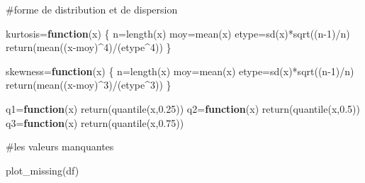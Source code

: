 \documentclass[
]{article}
\newenvironment{Shaded}{\begin{snugshade}}{\end{snugshade}}
\newcommand{\ControlFlowTok}[1]{\textcolor[rgb]{0.13,0.29,0.53}{\textbf{#1}}}
\newcommand{\DecValTok}[1]{\textcolor[rgb]{0.00,0.00,0.81}{#1}}
\newcommand{\FloatTok}[1]{\textcolor[rgb]{0.00,0.00,0.81}{#1}}
\newcommand{\FunctionTok}[1]{\textcolor[rgb]{0.00,0.00,0.00}{#1}}
\newcommand{\NormalTok}[1]{#1}
\newcommand{\OtherTok}[1]{\textcolor[rgb]{0.56,0.35,0.01}{#1}}
\newcommand{\SpecialCharTok}[1]{\textcolor[rgb]{0.00,0.00,0.00}{#1}}
\begin{document}
\#forme de distribution et de dispersion

\begin{Shaded}
\begin{Highlighting}[]
\NormalTok{kurtosis}\OtherTok{=}\ControlFlowTok{function}\NormalTok{(x)}
\NormalTok{\{}
\NormalTok{    n}\OtherTok{=}\FunctionTok{length}\NormalTok{(x)}
\NormalTok{    moy}\OtherTok{=}\FunctionTok{mean}\NormalTok{(x)}
\NormalTok{    etype}\OtherTok{=}\FunctionTok{sd}\NormalTok{(x)}\SpecialCharTok{*}\FunctionTok{sqrt}\NormalTok{((n}\DecValTok{{-}1}\NormalTok{)}\SpecialCharTok{/}\NormalTok{n)}
    \FunctionTok{return}\NormalTok{(}\FunctionTok{mean}\NormalTok{((x}\SpecialCharTok{{-}}\NormalTok{moy)}\SpecialCharTok{\^{}}\DecValTok{4}\NormalTok{)}\SpecialCharTok{/}\NormalTok{(etype}\SpecialCharTok{\^{}}\DecValTok{4}\NormalTok{))}
\NormalTok{\}}


\NormalTok{skewness}\OtherTok{=}\ControlFlowTok{function}\NormalTok{(x)}
\NormalTok{\{}
\NormalTok{    n}\OtherTok{=}\FunctionTok{length}\NormalTok{(x)}
\NormalTok{    moy}\OtherTok{=}\FunctionTok{mean}\NormalTok{(x)}
\NormalTok{    etype}\OtherTok{=}\FunctionTok{sd}\NormalTok{(x)}\SpecialCharTok{*}\FunctionTok{sqrt}\NormalTok{((n}\DecValTok{{-}1}\NormalTok{)}\SpecialCharTok{/}\NormalTok{n)}
    \FunctionTok{return}\NormalTok{(}\FunctionTok{mean}\NormalTok{((x}\SpecialCharTok{{-}}\NormalTok{moy)}\SpecialCharTok{\^{}}\DecValTok{3}\NormalTok{)}\SpecialCharTok{/}\NormalTok{(etype}\SpecialCharTok{\^{}}\DecValTok{3}\NormalTok{))}
\NormalTok{\}}

\NormalTok{q1}\OtherTok{=}\ControlFlowTok{function}\NormalTok{(x) }\FunctionTok{return}\NormalTok{(}\FunctionTok{quantile}\NormalTok{(x,}\FloatTok{0.25}\NormalTok{))}
\NormalTok{q2}\OtherTok{=}\ControlFlowTok{function}\NormalTok{(x) }\FunctionTok{return}\NormalTok{(}\FunctionTok{quantile}\NormalTok{(x,}\FloatTok{0.5}\NormalTok{))}
\NormalTok{q3}\OtherTok{=}\ControlFlowTok{function}\NormalTok{(x) }\FunctionTok{return}\NormalTok{(}\FunctionTok{quantile}\NormalTok{(x,}\FloatTok{0.75}\NormalTok{))}
\end{Highlighting}
\end{Shaded}

\#les valeurs manquantes

\begin{Shaded}
\begin{Highlighting}[]
\FunctionTok{plot\_missing}\NormalTok{(df)}
\end{Highlighting}
\end{Shaded}
\end{document}
